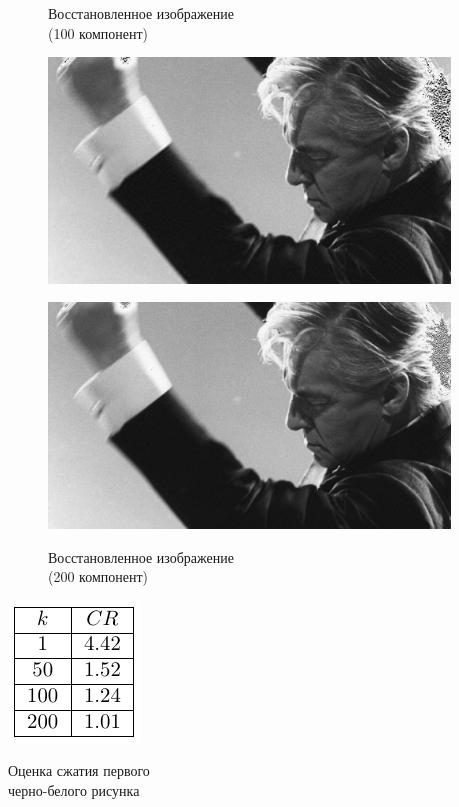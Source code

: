 \documentclass[a4paper]{article}
\begin{document}
\begin{figure}[H]
\centering
    \begin{minipage}{.5\textwidth}
    \centering
    \caption{Восстановленное изображение \\(100 компонент)}
    \includegraphics[width = 0.95\textwidth]{reconstructions/with_100comps_Herbert_von_Karajan.jpg}
    \label{fig:hvk_100}
    \end{minipage}%
    \begin{minipage}{.5\textwidth}
    \caption{Восстановленное изображение \\(200 компонент)}
    \includegraphics[width = 0.95\textwidth]{reconstructions/with_200comps_Herbert_von_Karajan.jpg}
    \label{fig:hvk_200}
    \end{minipage}%
\end{figure}
\begin{table}[H]
    \centering
    \includegraphics[]{tables/CR_for_Herbert_von_Karajan.pdf}
    \caption{Оценка сжатия первого\\черно-белого рисунка}
    \label{tab:hvk}
\end{table}
\end{document}
